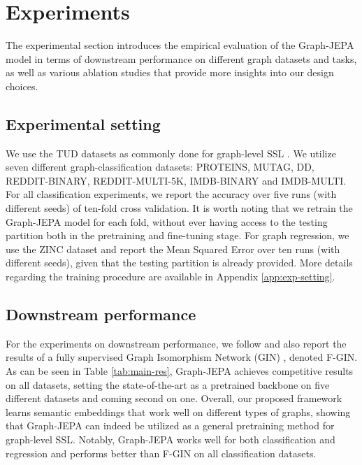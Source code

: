 \documentclass{article} \usepackage{iclr2024_conference,times}
\begin{document}
\section{Experiments}
The experimental section introduces the empirical evaluation of the Graph-JEPA model in terms of downstream performance on different graph datasets and tasks, as well as various ablation studies that provide more insights into our design choices. 

\subsection{Experimental setting}
We use the TUD datasets \citep{Morris2020TUD} as commonly done for graph-level SSL \citep{suresh2021adversarial,tan2023s2gae}. We utilize seven different graph-classification datasets: PROTEINS, MUTAG, DD, REDDIT-BINARY, REDDIT-MULTI-5K, IMDB-BINARY and IMDB-MULTI. For all classification experiments, we report the accuracy over five runs (with different seeds) of ten-fold cross validation. It is worth noting that we retrain the Graph-JEPA model for each fold, without ever having access to the testing partition both in the pretraining and fine-tuning stage. For graph regression, we use the ZINC dataset and report the Mean Squared Error over ten runs (with different seeds), given that the testing partition is already provided. More details regarding the training procedure are available in Appendix \ref{app:exp-setting}.

\subsection{Downstream performance} \label{sec:downstream}
For the experiments on downstream performance, we follow \citet{suresh2021adversarial} and also report the results of a fully supervised Graph Isomorphism Network (GIN) \citep{xu2018powerful}, denoted F-GIN. As can be seen in Table \ref{tab:main-res}, Graph-JEPA achieves competitive results on all datasets, setting the state-of-the-art as a pretrained backbone on five different datasets and coming second on one. Overall, our proposed framework learns semantic embeddings that work well on different types of graphs, showing that Graph-JEPA can indeed be utilized as a general pretraining method for graph-level SSL. Notably, Graph-JEPA works well for both classification and regression and performs better than F-GIN on all classification datasets.
\end{document}
